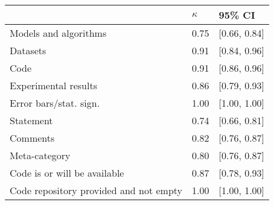 \begin{tabular}{lll}
\hline
& $\kappa$ & 95\% CI\\
\hline
Models and algorithms & 0.75 & [0.66, 0.84]  \\
Datasets & 0.91 & [0.84, 0.96]  \\
Code & 0.91 & [0.86, 0.96]  \\
Experimental results & 0.86 & [0.79, 0.93]  \\
Error bars/stat. sign.& 1.00 & [1.00, 1.00]  \\
Statement & 0.74 & [0.66, 0.81]  \\
Comments & 0.82  & [0.76, 0.87]  \\
Meta-category & 0.80  & [0.76, 0.87]  \\
Code is or will be available & 0.87 & [0.78, 0.93]  \\
Code repository provided and not empty & 1.00 & [1.00, 1.00]  \\
\hline
\end{tabular}
